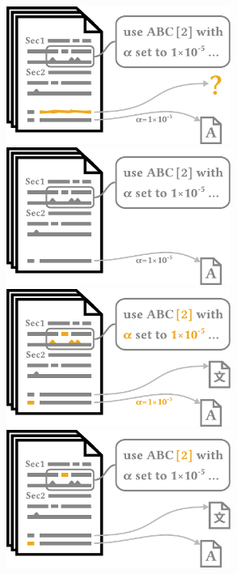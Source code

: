 \documentclass[en,16:9,smallfoot]{sdqbeamer}
\begin{document}
\begin{frame}
\begin{overprint}
            \centering\includegraphics[width=0.55\textwidth]{imgs/schema_add_09_vargapling_2}
            \centering\includegraphics[width=0.55\textwidth]{imgs/schema_add_09_vargapling_3}
            \centering\includegraphics[width=0.55\textwidth]{imgs/schema_add_09_vargapartf_0}
            \centering\includegraphics[width=0.55\textwidth]{imgs/schema_add_09_vargapartf_1}
       \end{overprint}
   \end{frame}
\end{document}
